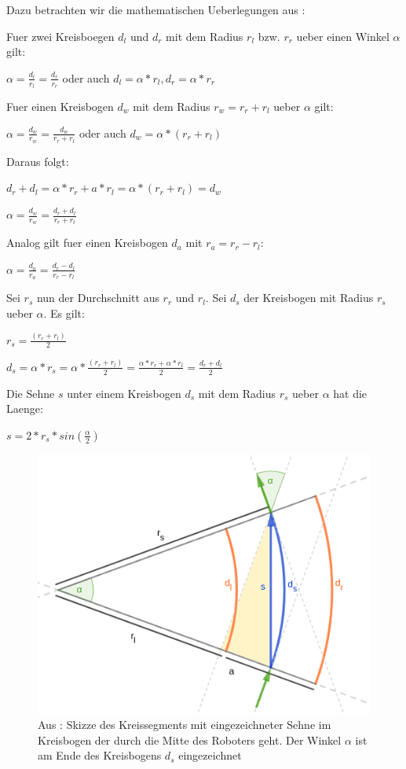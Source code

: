 \documentclass[11pt,a4paper]{article}
\begin{document}
Dazu betrachten wir die mathematischen Ueberlegungen aus \cite{website:dresden}:

Fuer zwei Kreisboegen $d_l$ und $d_r$ mit dem Radius $r_l$ bzw. $r_r$ ueber einen Winkel $\alpha$ gilt:

$\alpha = \frac{d_l}{r_l} = \frac{d_r}{r_r}$ oder auch $d_l = \alpha * r_l, d_r = \alpha * r_r$

Fuer einen Kreisbogen $d_w$ mit dem Radius $r_w = r_r + r_l$ ueber $\alpha$ gilt: 

$\alpha = \frac{d_w}{r_w} = \frac{d_w}{r_r+r_l}$ oder auch $d_w = \alpha * (r_r + r_l)$

Daraus folgt: 

$d_r + d_l = \alpha * r_r + a * r_l = \alpha * (r_r + r_l) = d_w$

$\alpha = \frac{d_w}{r_w} = \frac{d_r+d_l}{r_r + r_l}$

Analog gilt fuer einen Kreisbogen $d_a$ mit $r_a = r_r - r_l$:

$\alpha = \frac{d_a}{r_a} = \frac{d_r-d_l}{r_r-r_l}$

Sei $r_s$ nun der Durchschnitt aus $r_r$ und $r_l$. Sei $d_s$ der Kreisbogen mit Radius $r_s$ ueber $\alpha$. Es gilt:

$r_s = \frac{(r_r + r_l)}{2}$

$d_s = \alpha * r_s = \alpha * \frac{(r_r + r_l)}{2} = \frac{\alpha * r_r + \alpha * r_l}{2} = \frac{d_r + d_l}{2}$

Die Sehne $s$ unter einem Kreisbogen $d_s$ mit dem Radius $r_s$ ueber $\alpha$ hat die Laenge:

$ s = 2 * r_s * sin(\frac{\alpha}{2})$

\begin{figure}[ht]
  \centering
  \includegraphics[width = 12cm]{richtungsaenderung.png}
  \caption{Aus \cite{website:dresden}: Skizze des Kreissegments mit eingezeichneter Sehne im Kreisbogen der durch die Mitte des Roboters geht. Der Winkel $\alpha$ ist am Ende
  des Kreisbogens $d_s$ eingezeichnet}
  \label{fig: Richtungsaenderung}
\end{figure}
\end{document}
